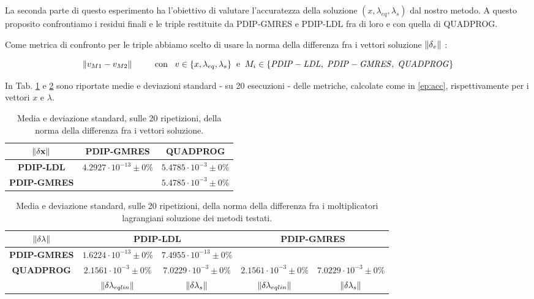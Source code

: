 La seconda parte di questo esperimento ha l'obiettivo di valutare l'accuratezza della soluzione $(x, \lambda_{eq}, \lambda_s)$ dal nostro metodo. A questo proposito confrontiamo i residui finali e le triple restituite da PDIP-GMRES e PDIP-LDL fra di loro e con quella di QUADPROG. 

Come metrica di confronto per le triple abbiamo scelto di usare la norma della differenza fra i vettori soluzione $\left\lVert\delta_v\right\rVert$ :

\begin{equation}\label{ep:acc}
     \left\lVert v_{M1} - v_{M2}\right\rVert \;\;\;\;\;\;\;\;\; \mathrm{con} \;\;\; v\in \{ x, \lambda_{eq}, \lambda_s\} \;\; \mathrm{e} \;\; M_i \in \{{\scriptsize\mathit{PDIP-LDL},\; \mathit{PDIP-GMRES}, \; \mathit{QUADPROG}}\}
\end{equation}

In Tab. \ref{tab:normx} e \ref{tab:norml} sono riportate medie e deviazioni standard - su 20 esecuzioni - delle metriche, calcolate come in \ref{ep:acc}, rispettivamente per i vettori $x$ e $\lambda$.   

\begin{table}[!h]
\centering
\begin{tabular}{c|c|l|c}
$\mathbf{\left\lVert\delta x\right\rVert}$ & \multicolumn{2}{c|}{\textbf{PDIP-GMRES}}         & \textbf{QUADPROG}          \\ \hline
\textbf{PDIP-LDL}            & \multicolumn{2}{c|}{$4.2927\cdot10^{-13}\pm0\%$} & $5.4785\cdot10^{-3}\pm0\%$ \\ \hline
\textbf{PDIP-GMRES}          & \multicolumn{2}{c|}{}                            & $5.4785\cdot10^{-3}\pm0\%$
\end{tabular}
\caption{Media e deviazione standard, sulle 20 ripetizioni, della norma della differenza fra i vettori soluzione.\label{tab:normx}}
\end{table}

\begin{table}[!h]
\begin{tabular}{c|c|c|c|c|}
      $\mathbf{\left\lVert\delta\lambda\right\rVert}$             & \multicolumn{2}{c|}{\textbf{PDIP-LDL}}                                        & \multicolumn{2}{c|}{\textbf{PDIP-GMRES}}                                      \\ \hline
\textbf{PDIP-GMRES} & $1.6224\cdot10^{-13}\pm0\%$          & $7.4955\cdot10^{-13}\pm0\%$         & \multicolumn{2}{c|}{ }                                                        \\ 
\textbf{QUADPROG}   & $2.1561\cdot10^{-3}\pm0\%$            & $7.0229\cdot10^{-3}\pm0\%$            & $2.1561\cdot10^{-3}\pm0\%$            & $7.0229\cdot10^{{-3}}\pm0\%$          \\
                    & $\left\lVert \delta\lambda_{eqlin} \right\rVert$ & $\left\lVert \delta\lambda_{s} \right\rVert$ & $\left\lVert \delta\lambda_{eqlin} \right\rVert$ & $\left\lVert \delta\lambda_{s} \right\rVert$
\end{tabular}
\caption{Media e deviazione standard, sulle 20 ripetizioni, della norma della differenza fra i moltiplicatori lagrangiani soluzione dei metodi testati.\label{tab:norml}}
\end{table}

